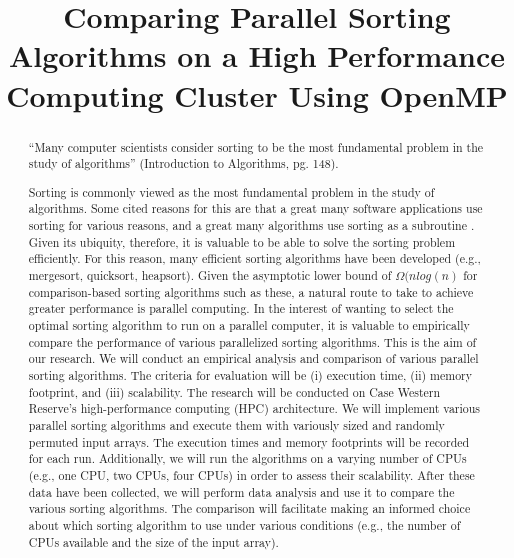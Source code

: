 \documentclass[conference]{IEEEtran}
\begin{document}
		\title{Comparing Parallel Sorting Algorithms on a High Performance Computing Cluster Using OpenMP}
			\author{
			\and
			\and
			\and
			}
	\maketitle
	
\begin{abstract}
“Many computer scientists consider sorting to be the most fundamental problem in the study of algorithms” (Introduction to Algorithms, pg. 148).

Sorting is commonly viewed as the most fundamental problem in the study of algorithms. Some cited reasons for this are that a great many software applications use sorting for various reasons, and a great many algorithms use sorting as a subroutine \cite{cormen_introduction_2009}. 
Given its ubiquity, therefore, it is valuable to be able to solve the sorting problem efficiently. 
For this reason, many efficient sorting algorithms have been developed (e.g., mergesort, quicksort, heapsort). 
Given the asymptotic lower bound of $\Omega(nlog(n)$ for comparison-based sorting algorithms such as these, a natural route to take to achieve greater performance is parallel computing. 
In the interest of wanting to select the optimal sorting algorithm to run on a parallel computer, it is valuable to empirically compare the performance of various parallelized sorting algorithms. 
This is the aim of our research. 
We will conduct an empirical analysis and comparison of various parallel sorting algorithms. 
The criteria for evaluation will be (i) execution time, (ii) memory footprint, and (iii) scalability. 
The research will be conducted on Case Western Reserve’s high-performance computing (HPC) architecture. 
We will implement various parallel sorting algorithms and execute them with variously sized and randomly permuted input arrays. The execution times and memory footprints will be recorded for each run. 
Additionally, we will run the algorithms on a varying number of CPUs (e.g., one CPU, two CPUs, four CPUs) in order to assess their scalability. 
After these data have been collected, we will perform data analysis and use it to compare the various sorting algorithms. 
The comparison will facilitate making an informed choice about which sorting algorithm to use under various conditions (e.g., the number of CPUs available and the size of the input array).
\end{abstract}
\end{document}
